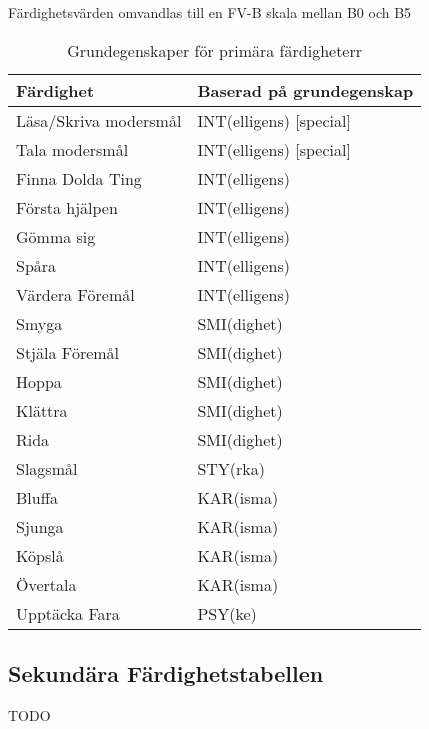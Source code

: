 \documentclass[a4paper, 10pt, titlepage]{article}
\begin{document}
Färdighetsvärden omvandlas till en FV-B skala mellan B0 och B5

\begin{table}[hbp]
  \caption{Grundegenskaper för primära färdigheterr}
  \begin{tabular}{|l|l|}
    \hline
    Färdighet         & Baserad på grundegenskap \\
    \hline
    Läsa/Skriva modersmål & INT(elligens) [special] \\
    Tala modersmål        & INT(elligens) [special] \\
    Finna Dolda Ting  & INT(elligens) \\
    Första hjälpen    & INT(elligens) \\
    Gömma sig         & INT(elligens) \\
    Spåra             & INT(elligens) \\
    Värdera Föremål   & INT(elligens) \\
    Smyga             & SMI(dighet) \\
    Stjäla Föremål    & SMI(dighet) \\
    Hoppa             & SMI(dighet)   \\
    Klättra           & SMI(dighet)   \\
    Rida              & SMI(dighet) \\
    Slagsmål          & STY(rka) \\
    Bluffa            & KAR(isma) \\
    Sjunga            & KAR(isma) \\
    Köpslå            & KAR(isma)  \\
    Övertala          & KAR(isma) \\
    Upptäcka Fara     & PSY(ke) \\
    \hline
  \end{tabular}
\end{table}

\subsection{Sekundära Färdighetstabellen}

TODO
\end{document}
